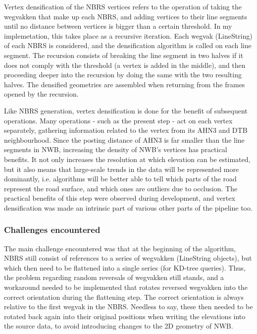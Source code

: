Vertex densification of the NBRS vertices refers to the operation of taking the wegvakken that make up each NBRS, and adding vertices to their line segments until no distance between vertices is bigger than a certain threshold. In my implemetation, this takes place as a recursive iteration. Each wegvak (LineString) of each NBRS is considered, and the densification algorithm is called on each line segment. The recursion consists of breaking the line segment in two halves if it does not comply with the threshold (a vertex is added in the middle), and then proceeding deeper into the recursion by doing the same with the two resulting halves. The densified geometries are assembled when returning from the frames opened by the recursion.

Like NBRS generation, vertex densification is done for the benefit of subsequent operations. Many operations - such as the present step - act on each vertex separately, gathering information related to the vertex from its AHN3 and DTB neighbourhood. Since the posting distance of AHN3 is far smaller than the line segments in NWB, increasing the density of NWB's vertices has practical benefits. It not only increases the resolution at which elevation can be estimated, but it also means that large-scale trends in the data will be represented more dominantly, i.e. algorithms will be better able to tell which parts of the road represent the road surface, and which ones are outliers due to occlusion. The practical benefits of this step were observed during development, and vertex densification was made an intrinsic part of various other parts of the pipeline too.

\subsubsection{Challenges encountered}

The main challenge encountered was that at the beginning of the algorithm, NBRS still consist of references to a series of wegvakken (LineString objects), but which then need to be flattened into a single series (for KD-tree queries). Thus, the problem regarding random reversals of wegvakken still stands, and a workaround needed to be implemented that rotates reversed wegvakken into the correct orientation during the flattening step. The correct orientation is always relative to the first wegvak in the NBRS. Needless to say, these then needed to be rotated back again into their original positions when writing the elevations into the source data, to avoid introducing changes to the 2D geometry of NWB.

